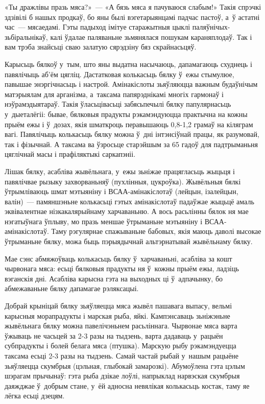 «Ты дражлівы празь мяса?»~--- «А бязь мяса я пачуваюся слабым!» Такія спрэчкі здзівілі б нашых продкаў, бо яны былі вэгетарыянцамі падчас пастоў, а~ў астатні час~--- мясаедамі. Гэты падыход імітуе старажытныя цыклі паляўнічых-зьбіральнікаў, калі ўдалае паляваньне зьмянялася пошукам караняплодаў. Так і вам трэба знайсьці сваю залатую сярэдзіну бяз скрайнасьцяў.

Карысьць бялкоў у~тым, што яны выдатна насычаюць, дапамагаюць схуднець і павялічыць аб'ём цягліц. Дастатковая колькасьць бялку ў~ежы стымулюе, павышае энэргічнасьць і настрой. Амінакіслоты зьяўляюцца важным будаўнічым матэрыялам для арганізма, а~таксама папярэднікамі многіх гармонаў і нэўрамэдыятараў. Такія ўласьцівасьці забясьпечылі бялку папулярнасьць у~дыеталёгіі: бывае, бялковыя прадукты рэкамэндуюцца практычна на кожны прыём ежы і ў~дозах, якія шматкроць перавышаюць 0,8-1,2 грамаў на кіляграм вагі. Павялічыць колькасьць бялку можна ў~дні інтэнсіўнай працы, як разумовай, так і фізычнай. А таксама ва ўзросьце старэйшым за 65 гадоў для падтрыманьня цяглічнай масы і прафіляктыкі саркапэніі.

Лішак бялку, асабліва жывёльнага, у~ежы зьніжае працягласьць жыцьця і павялічвае рызыку захворваньняў (пухлінныя, цукроўка). Жывёльныя бялкі ўтрымліваюць шмат мэтыяніну і ВСАА-амінакіслотаў (лейцын, ізалейцын, валін)~--- памяншэньне колькасьці гэтых амінакіслотаў падаўжае жыцьцё амаль эквівалентнае нізкакалярыйнаму харчаваньню. А вось расьлінны бялок ня мае нэгатыўнага ўплыву, мо празь меншае ўтрыманьне мэтыяніну і ВСАА-амінакіслотаў. Таму рэгулярнае спажываньне бабовых, якія маюць даволі высокае ўтрыманьне бялку, можа быць пэрыядычнай альтэрнатывай жывёльнаму бялку.

Мае сэнс абмяжоўваць колькасьць бялку ў~харчаваньні, асабліва за кошт чырвонага мяса: есьці бялковыя прадукты ня ў~кожны прыём ежы, ладзіць вэганскія дні. Асабліва карысна гэта на выходных ці ў~адпачынку, бо абмежаваньне бялку дапамагае рэляксацыі.

Добрай крыніцай бялку зьяўляецца мяса жывёл пашавага выпасу, вельмі карысныя морапрадукты і марская рыба, яйкі. Кампэнсаваць зьніжэньне жывёльнага бялку можна павелічэньнем расьліннага. Чырвонае мяса варта ўжываць не часьцей за 2-3 разы на тыдзень, варта дадаваць у~рацыён субпрадукты і болей белага мяса (птушка). Марскую рыбу рэкамэндуецца таксама есьці 2-3 разы на тыдзень. Самай частай рыбай у~нашым рацыёне зьяўляецца скумбрыя (цэльная, глыбокай замарозкі). Абумоўлена гэта цэлым шэрагам прычынаў: гэта рыба дзікае лоўлі, напрыклад нарвэская скумбрыя даяжджае ў~добрым стане, у~ёй адносна невялікая колькасьць костак, таму яе лёгка есьці дзецям.

